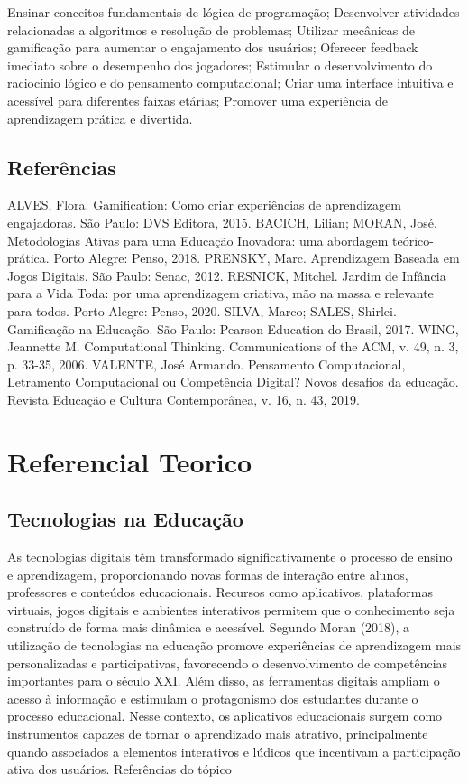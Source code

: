 \documentclass{article}
\begin{document}
Ensinar conceitos fundamentais de lógica de programação;
Desenvolver atividades relacionadas a algoritmos e resolução de problemas;
Utilizar mecânicas de gamificação para aumentar o engajamento dos usuários;
Oferecer feedback imediato sobre o desempenho dos jogadores;
Estimular o desenvolvimento do raciocínio lógico e do pensamento computacional;
Criar uma interface intuitiva e acessível para diferentes faixas etárias;
Promover uma experiência de aprendizagem prática e divertida.


\subsection{ Referências}
ALVES, Flora. Gamification: Como criar experiências de aprendizagem engajadoras. São Paulo: DVS Editora, 2015.
BACICH, Lilian; MORAN, José. Metodologias Ativas para uma Educação Inovadora: uma abordagem teórico-prática. Porto Alegre: Penso, 2018.
PRENSKY, Marc. Aprendizagem Baseada em Jogos Digitais. São Paulo: Senac, 2012.
RESNICK, Mitchel. Jardim de Infância para a Vida Toda: por uma aprendizagem criativa, mão na massa e relevante para todos. Porto Alegre: Penso, 2020.
SILVA, Marco; SALES, Shirlei. Gamificação na Educação. São Paulo: Pearson Education do Brasil, 2017.
WING, Jeannette M. Computational Thinking. Communications of the ACM, v. 49, n. 3, p. 33-35, 2006.
VALENTE, José Armando. Pensamento Computacional, Letramento Computacional ou Competência Digital? Novos desafios da educação. Revista Educação e Cultura Contemporânea, v. 16, n. 43, 2019.








\section{Referencial Teorico}
\subsection{ Tecnologias na Educação}
As tecnologias digitais têm transformado significativamente o processo de ensino e aprendizagem, proporcionando novas formas de interação entre alunos, professores e conteúdos educacionais. Recursos como aplicativos, plataformas virtuais, jogos digitais e ambientes interativos permitem que o conhecimento seja construído de forma mais dinâmica e acessível.
Segundo Moran (2018), a utilização de tecnologias na educação promove experiências de aprendizagem mais personalizadas e participativas, favorecendo o desenvolvimento de competências importantes para o século XXI. Além disso, as ferramentas digitais ampliam o acesso à informação e estimulam o protagonismo dos estudantes durante o processo educacional.
Nesse contexto, os aplicativos educacionais surgem como instrumentos capazes de tornar o aprendizado mais atrativo, principalmente quando associados a elementos interativos e lúdicos que incentivam a participação ativa dos usuários.
Referências do tópico
\end{document}
